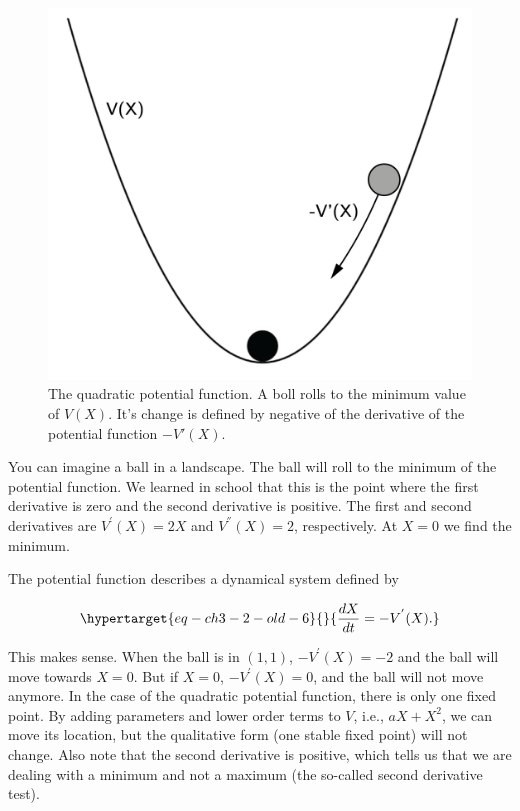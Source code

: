 \documentclass[
  a4paper,
  DIV=11,
  numbers=noendperiod]{scrreprt}
\begin{document}
\begin{figure}

{\centering \includegraphics{media/ch3/ch3-03__figure15.png}

}

\caption{\label{fig-ch3-img3-old-15}The quadratic potential function. A
boll rolls to the minimum value of \(V(X)\). It's change is defined by
negative of the derivative of the potential function \(-V'(X)\).}

\end{figure}

You can imagine a ball in a landscape. The ball will roll to the minimum
of the potential function. We learned in school that this is the point
where the first derivative is zero and the second derivative is
positive. The first and second derivatives are \(V^{'}(X) = 2X\) and
\(V^{''}(X) = 2\), respectively. At \(X = 0\) we find the minimum.

The potential function describes a dynamical system defined by

\begin{equation}\protect\hypertarget{eq-ch3-2-old-6}{}{
\frac{dX}{dt} = - V^{'}(X).
}\label{eq-ch3-2-old-6}\end{equation}

This makes sense. When the ball is in \((1,1)\), \(- V^{'}(X) = - 2\)
and the ball will move towards \(X = 0\). But if \(X = 0\),
\(- V^{'}(X) = 0\), and the ball will not move anymore. In the case of
the quadratic potential function, there is only one fixed point. By
adding parameters and lower order terms to \(V\), i.e.,
\({aX + X}^{2}\), we can move its location, but the qualitative form
(one stable fixed point) will not change. Also note that the second
derivative is positive, which tells us that we are dealing with a
minimum and not a maximum (the so-called second derivative test).
\end{document}
